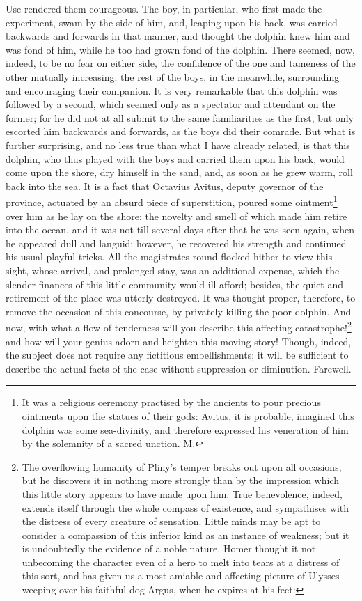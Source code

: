 Use rendered them courageous. The boy, in particular, who first made the
experiment, swam by the side of him, and, leaping upon his back, was
carried backwards and forwards in that manner, and thought the dolphin
knew him and was fond of him, while he too had grown fond of the dolphin.
There seemed, now, indeed, to be no fear on either side, the confidence of
the one and tameness of the other mutually increasing; the rest of the
boys, in the meanwhile, surrounding and encouraging their companion. It is
very remarkable that this dolphin was followed by a second, which seemed
only as a spectator and attendant on the former; for he did not at all
submit to the same familiarities as the first, but only escorted him
backwards and forwards, as the boys did their comrade. But what is further
surprising, and no less true than what I have already related, is that
this dolphin, who thus played with the boys and carried them upon his
back, would come upon the shore, dry himself in the sand, and, as soon as
he grew warm, roll back into the sea. It is a fact that Octavius Avitus,
deputy governor of the province, actuated by an absurd piece of
superstition, poured some ointment\footnote{It was a religious
ceremony practised by the ancients to pour precious ointments upon the
statues of their gods: Avitus, it is probable, imagined this dolphin was
some sea-divinity, and therefore expressed his veneration of him by the
solemnity of a sacred unction. M.} over him as he lay
on the shore: the novelty and smell of which made him retire into the
ocean, and it was not till several days after that he was seen again, when
he appeared dull and languid; however, he recovered his strength and
continued his usual playful tricks. All the magistrates round flocked
hither to view this sight, whose arrival, and prolonged stay, was an
additional expense, which the slender finances of this little community
would ill afford; besides, the quiet and retirement of the place was
utterly destroyed. It was thought proper, therefore, to remove the
occasion of this concourse, by privately killing the poor dolphin. And
now, with what a flow of tenderness will you describe this affecting
catastrophe!\footnote{The overflowing
humanity of Pliny's temper breaks out upon all occasions, but he discovers
it in nothing more strongly than by the impression which this little story
appears to have made upon him. True benevolence, indeed, extends itself
through the whole compass of existence, and sympathises with the distress
of every creature of sensation. Little minds may be apt to consider a
compassion of this inferior kind as an instance of weakness; but it is
undoubtedly the evidence of a noble nature. Homer thought it not
unbecoming the character even of a hero to melt into tears at a distress
of this sort, and has given us a most amiable and affecting picture of
Ulysses weeping over his faithful dog Argus, when he expires at his feet:} and how will your genius adorn and heighten
this moving story! Though, indeed, the subject does not require any
fictitious embellishments; it will be sufficient to describe the actual
facts of the case without suppression or diminution. Farewell.


